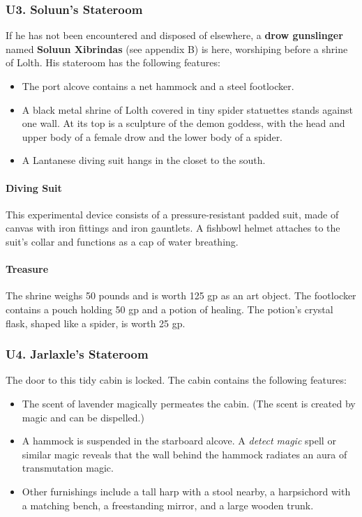 \documentclass[10pt,a4paper,twoside,twocolumn,openany,nodeprecatedcode]{dndbook}
\begin{document}
\subsubsection{U3. Soluun's Stateroom}
If he has not been encountered and disposed of elsewhere, a \textbf{drow gunslinger} named \textbf{Soluun Xibrindas} (see appendix B) is here, worshiping before a shrine of Lolth. His stateroom has the following features:
\begin{itemize}

\item The port alcove contains a net hammock and a steel footlocker.
\item A black metal shrine of Lolth covered in tiny spider statuettes stands against one wall. At its top is a sculpture of the demon goddess, with the head and upper body of a female drow and the lower body of a spider.
\item A Lantanese diving suit hangs in the closet to the south.
\end{itemize}


\paragraph{Diving Suit}
This experimental device consists of a pressure-resistant padded suit, made of canvas with iron fittings and iron gauntlets. A fishbowl helmet attaches to the suit's collar and functions as a cap of water breathing.
\paragraph{Treasure}
The shrine weighs 50 pounds and is worth 125 gp as an art object. The footlocker contains a pouch holding 50 gp and a potion of healing. The potion's crystal flask, shaped like a spider, is worth 25 gp.
\subsubsection{U4. Jarlaxle's Stateroom}
The door to this tidy cabin is locked. The cabin contains the following features:
\begin{itemize}

\item The scent of lavender magically permeates the cabin. (The scent is created by magic and can be dispelled.)
\item A hammock is suspended in the starboard alcove. A \textit{detect magic} spell or similar magic reveals that the wall behind the hammock radiates an aura of transmutation magic.
\item Other furnishings include a tall harp with a stool nearby, a harpsichord with a matching bench, a freestanding mirror, and a large wooden trunk.
\end{itemize}
\end{document}
